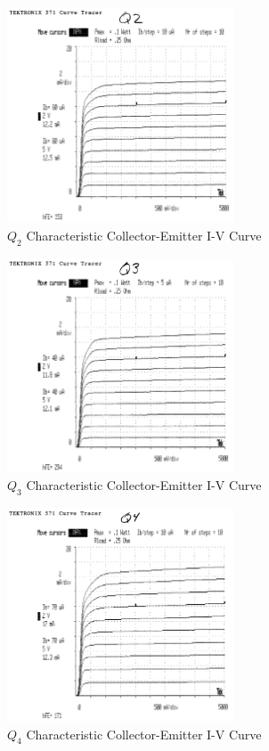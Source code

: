 \documentclass[titlepage, letterpaper, 10.5pt]{article}
\begin{document}
\begin{figure}[ht]
	\centering
	\includegraphics[width=0.6\textwidth]{results/q2-characteristics}
	\caption{$Q_{2}$ Characteristic Collector-Emitter I-V Curve}
\end{figure}

\begin{figure}[ht]
	\centering
	\includegraphics[width=0.6\textwidth]{results/q3-characteristics}
	\caption{$Q_{3}$ Characteristic Collector-Emitter I-V Curve}
\end{figure}

\begin{figure}[ht]
	\centering
	\includegraphics[width=0.6\textwidth]{results/q4-characteristics}
	\caption{$Q_{4}$ Characteristic Collector-Emitter I-V Curve}
\end{figure}
\end{document}
